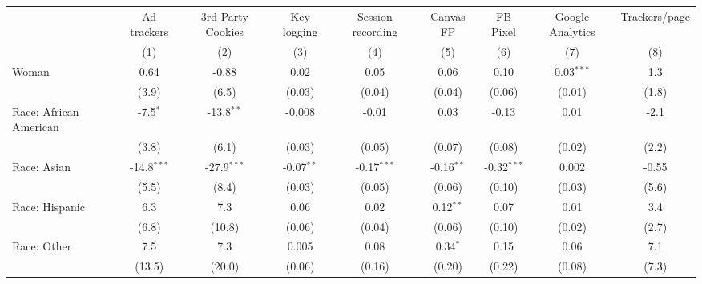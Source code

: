 
\begingroup
\centering
\begin{adjustbox}{width = \textwidth, center}
   \begin{tabular}{lcccccccc}
      \toprule
                              & Ad trackers   & 3rd Party Cookies & Key logging  & Session recording & Canvas FP    & FB Pixel      & Google Analytics & Trackers/page \\   
                              & (1)           & (2)               & (3)          & (4)               & (5)          & (6)           & (7)              & (8)\\  
      \midrule 
      Woman                   & 0.64          & -0.88             & 0.02         & 0.05              & 0.06         & 0.10          & 0.03$^{***}$     & 1.3\\   
                              & (3.9)         & (6.5)             & (0.03)       & (0.04)            & (0.04)       & (0.06)        & (0.01)           & (1.8)\\   
      Race: African American  & -7.5$^{*}$    & -13.8$^{**}$      & -0.008       & -0.01             & 0.03         & -0.13         & 0.01             & -2.1\\   
                              & (3.8)         & (6.1)             & (0.03)       & (0.05)            & (0.07)       & (0.08)        & (0.02)           & (2.2)\\   
      Race: Asian             & -14.8$^{***}$ & -27.9$^{***}$     & -0.07$^{**}$ & -0.17$^{***}$     & -0.16$^{**}$ & -0.32$^{***}$ & 0.002            & -0.55\\   
                              & (5.5)         & (8.4)             & (0.03)       & (0.05)            & (0.06)       & (0.10)        & (0.03)           & (5.6)\\   
      Race: Hispanic          & 6.3           & 7.3               & 0.06         & 0.02              & 0.12$^{**}$  & 0.07          & 0.01             & 3.4\\   
                              & (6.8)         & (10.8)            & (0.06)       & (0.04)            & (0.06)       & (0.10)        & (0.02)           & (2.7)\\   
      Race: Other             & 7.5           & 7.3               & 0.005        & 0.08              & 0.34$^{*}$   & 0.15          & 0.06             & 7.1\\   
                              & (13.5)        & (20.0)            & (0.06)       & (0.16)            & (0.20)       & (0.22)        & (0.08)           & (7.3)\\   

\end{tabular}
\end{adjustbox}
